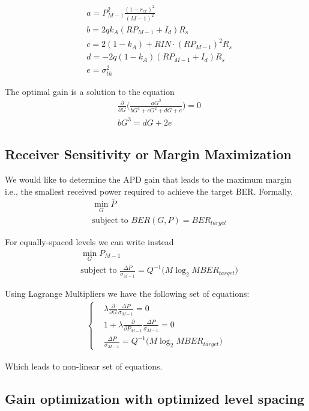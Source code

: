 \documentclass[a4paper]{article}
\begin{document}
\begin{align}
& a = P^2_{M-1}\frac{(1-r_{ex})^2}{(M-1)^2} \\
& b = 2qk_A(RP_{M-1} + I_d)R_s \\
& c = 2(1-k_A) + RIN\cdot (RP_{M-1})^2R_s \\
& d = -2q(1-k_A)(RP_{M-1} + I_d)R_s \\
& e = \sigma_{th}^2 
\end{align}

The optimal gain is a solution to the equation
\begin{align}
& \frac{\partial}{\partial G}\bigg(\frac{aG^2}{bG^3 + cG^2 + dG + e}\bigg) = 0 \\
& bG^3 = dG + 2e 
\end{align}

\subsection{Receiver Sensitivity or Margin Maximization}

We would like to determine the APD gain that leads to the maximum margin i.e., the smallest received power required to achieve the target BER. Formally,
\begin{align}
&\min_G \bar{P} \\
&\text{subject to } BER(G, P) = BER_{target}
\end{align}

For equally-spaced levels we can write instead
\begin{align}
&\min_G P_{M-1} \\
&\text{subject to } \frac{\Delta P}{\sigma_{M-1}} = Q^{-1}\Big(M\log_2 MBER_{target}\Big)
\end{align}

Using Lagrange Multipliers we have the following set of equations:
\begin{align}
\begin{cases}
& \lambda \frac{\partial}{\partial G} \frac{\Delta P}{\sigma_{M-1}} = 0 \\
& 1 + \lambda \frac{\partial}{\partial P_{M-1}} \frac{\Delta P}{\sigma_{M-1}} = 0 \\
& \frac{\Delta P}{\sigma_{M-1}} = Q^{-1}\Big(M\log_2 MBER_{target}\Big)
\end{cases}
\end{align}

Which leads to non-linear set of equations.

\subsection{Gain optimization with optimized level spacing}
\end{document}
